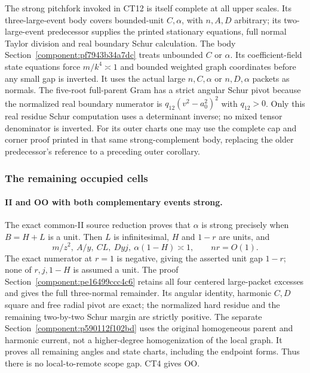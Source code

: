 The strong pitchfork invoked in CT12 is itself complete at all
upper scales.  Its three-large-event body covers bounded-unit
\(C,\alpha\), with \(n,A,D\) arbitrary; its two-large-event
predecessor supplies the printed stationary equations, full
normal Taylor division and real boundary Schur calculation.
The body Section~\ref{component:pf7943b34a7dc} treats
unbounded \(C\) or \(\alpha\).  Its coefficient-field state
equations force \(m/k^4\asymp1\) and bounded weighted graph
coordinates before any small gap is inverted.  It uses the
actual large \(n,C,\alpha\) or \(n,D,\alpha\) packets as normals.
The five-root full-parent Gram has a strict angular Schur pivot
because the normalized real boundary numerator is
\(q_{12}(v^2-a_0^2)^2\) with \(q_{12}>0\).
Only this real residue Schur computation uses a determinant
inverse; no mixed tensor denominator is inverted.
For its outer charts one may use the complete cap and corner
proof printed in that same strong-complement body, replacing
the older predecessor's reference to a preceding outer corollary.

\subsubsection*{The remaining occupied cells}

\paragraph{II and OO with both complementary events strong.}
The exact common-II source reduction proves that
\(\alpha\) is strong precisely when \(B=H+L\) is a unit.
Then \(L\) is infinitesimal, \(H\) and \(1-r\) are units, and
\[
 m/z^2,\ A/y,\ CL,\ Dyj,\ \alpha(1-H)\asymp1,
 \qquad nr=O(1).                                      \tag{CT14}
\]
The exact numerator at \(r=1\) is negative, giving the asserted
unit gap \(1-r\); none of \(r,j,1-H\) is assumed a unit.
The proof Section~\ref{component:pe16499ccc4c6} retains all four centered
large-packet excesses and gives the full three-normal remainder.
Its angular identity, harmonic \(C,D\) square and free radial
pivot are exact; the normalized hard residue and the remaining
two-by-two Schur margin are strictly positive.
The separate Section~\ref{component:p590112f102bd} uses the original
homogeneous parent and harmonic current, not a higher-degree
homogenization of the local graph.  It proves all remaining
angles and state charts, including the endpoint forms.
Thus there is no local-to-remote scope gap.  CT4 gives OO.

